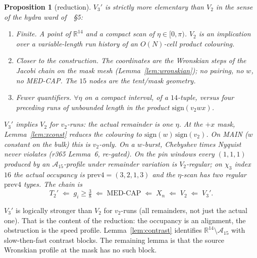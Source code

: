 \documentclass[11pt]{article}
\newtheorem{prop}{Proposition}
\theoremstyle{remark}
\newcommand{\R}{\mathbb{R}}
\begin{document}
\begin{prop}[reduction]\label{prop:v3}
$V_3'$ is strictly more elementary than $V_2$ in the sense of
the hydra ward of~\cite{v2}~\S5:
\begin{enumerate}
\item \emph{Finite.}  A point of $\R^{14}$ and a compact scan
  of $\eta\in[0,\pi)$.  $V_2$ is an implication over a
  variable-length run history of an $O(N)$-cell product
  colouring.
\item \emph{Closer to the construction.}  The coordinates are
  the Wronskian steps of the Jacobi chain on the mask mesh
  (Lemma~\ref{lem:wronskian}); no pairing, no $w$, no
  MED-CAP.  The $15$ nodes are the tent/mask geometry.
\item \emph{Fewer quantifiers.}  $\forall\eta$ on a compact
  interval, of a $14$-tuple, versus four preceding runs of
  unbounded length in the product $\mathrm{sign}(v_2 w x)$.
\end{enumerate}
$V_3'$ implies $V_2$ for $v_2$-runs: the actual remainder is
one $\eta$.  At the $+x$ mask, Lemma~\ref{lem:xconst} reduces
the colouring to $\mathrm{sign}(w)\,\mathrm{sign}(v_2)$.  On
MAIN ($w$ constant on the bulk) this is $v_2$-only.  On a
$w$-burst, Chebyshev times Nyquist never violates
(r365 Lemma~6, re-gated).  On the pin windows every
$(1,1,1)$ produced by an $\mathcal{A}_{15}$-profile under
remainder variation is $V_2$-regular; on $\chi_3$ index $16$
the actual occupancy is $\mathrm{prev4}=(3,2,1,3)$ and the
$\eta$-scan has two regular $\mathrm{prev4}$ types.  The chain is
\[
T_2'
 \;\Longleftarrow\;
 g_i\ge\tfrac38
 \;\Longleftarrow\;
 \mathrm{MED\text{-}CAP}
 \;\Longleftarrow\;
 X_n
 \;\Longleftarrow\;
 V_2
 \;\Longleftarrow\;
 V_3'.
\]
\end{prop}

$V_3'$ is logically stronger than $V_2$ for $v_2$-runs (all
remainders, not just the actual one).  That is the content of
the reduction: the occupancy is an alignment, the obstruction
is the speed profile.  Lemma~\ref{lem:contrast} identifies
$\R^{14}\setminus\mathcal{A}_{15}$ with slow-then-fast
contrast blocks.  The remaining lemma is that the source
Wronskian profile at the mask has no such block.
\end{document}
